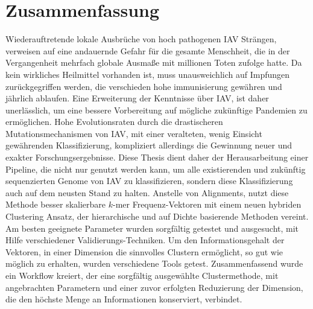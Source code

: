 \chapter*{Zusammenfassung}

Wiederauftretende lokale Ausbrüche von hoch pathogenen \gls{IAV} Strängen, verweisen auf eine andauernde Gefahr für die gesamte Menschheit, die in der Vergangenheit mehrfach globale Ausmaße mit millionen Toten zufolge hatte. Da kein wirkliches Heilmittel vorhanden ist, muss unausweichlich auf Impfungen zurückgegriffen werden, die verschieden hohe immunisierung gewähren und jährlich ablaufen. Eine Erweiterung der Kenntnisse über \gls{IAV}, ist daher unerlässlich, um eine bessere Vorbereitung auf mögliche zukünftige Pandemien zu ermöglichen. Hohe Evolutionsraten durch die drastischeren Mutationsmechanismen von \gls{IAV}, mit einer veralteten, wenig Einsicht gewährenden Klassifizierung, kompliziert allerdings die Gewinnung neuer und exakter Forschungsergebnisse. Diese Thesis dient daher der Herausarbeitung einer Pipeline, die nicht nur genutzt werden kann, um alle existierenden und zukünftig sequenzierten Genome von \gls{IAV} zu klassifizieren, sondern diese Klassifizierung auch auf dem neusten Stand zu halten. Anstelle von Alignments, nutzt diese Methode besser skalierbare $k$-mer Frequenz-Vektoren mit einem neuen hybriden Clustering Ansatz, der hierarchische und auf Dichte basierende Methoden vereint. Am besten geeignete Parameter wurden sorgfältig getestet und ausgesucht, mit Hilfe verschiedener Validierungs-Techniken. Um den Informationsgehalt der Vektoren, in einer Dimension die sinnvolles Clustern ermöglicht, so gut wie möglich zu erhalten, wurden verschiedene Tools getest. Zusammenfassend wurde ein Workflow kreiert, der eine sorgfältig ausgewählte Clustermethode, mit angebrachten Parametern und einer zuvor erfolgten Reduzierung der Dimension, die den höchste Menge an Informationen konserviert, verbindet.